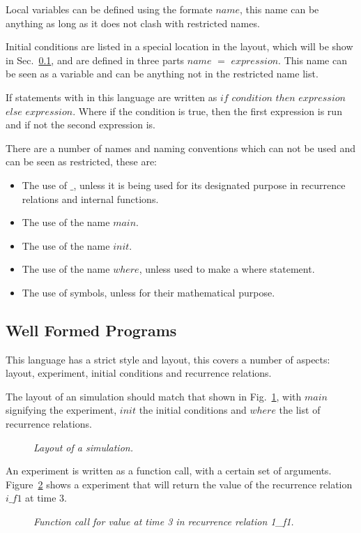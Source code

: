 \documentclass{article}
\begin{document}
Local variables can be defined using the formate $name$, this name can be anything as long as it does not clash with restricted names. 

Initial conditions are listed in a special location in the layout, which will be show in Sec.~\ref{wellformedprogs}, and are defined in three parts $name$ $=$ $expression$. This name can be seen as a variable and can be anything not in the restricted name list. 

If statements with in this language are written as $if$ $condition$ $then$ $expression$ $else$ $expression$. Where if the condition is true, then the first expression is run and if not the second expression is.  

There are a number of names and naming conventions which can not be used and can be seen as restricted, these are:
\begin{itemize}
  \item The use of $\_$, unless it is being used for its designated purpose in recurrence relations and internal functions. 
  \item The use of the name $main$.
  \item The use of the name $init$.
  \item The use of the name $where$, unless used to make a where statement.
  \item The use of symbols, unless for their mathematical purpose.  
\end{itemize}


\subsection{Well Formed Programs} \label{wellformedprogs} 
This language has a strict style and layout, this covers a number of aspects: layout, experiment, initial conditions and recurrence relations.  

The layout of an simulation should match that shown in Fig.~\ref{fig:1exofla}, with $main$ signifying the experiment, $init$ the initial conditions and $where$ the list of recurrence relations. 
\begin{figure}[H]
	\centering
	
	\caption{\it Layout of a simulation.}
	\label{fig:1exofla}
\end{figure} 

An experiment is written as a function call, with a certain set of arguments. Figure~\ref{fig:2exofla} shows a experiment that will return the value of the recurrence relation $i\_f1$ at time $3$.
\begin{figure}[H]
	\centering
	
	\caption{\it Function call for value at time 3 in recurrence relation 1\_f1.}
	\label{fig:2exofla}
\end{figure} 
 
\end{document}
